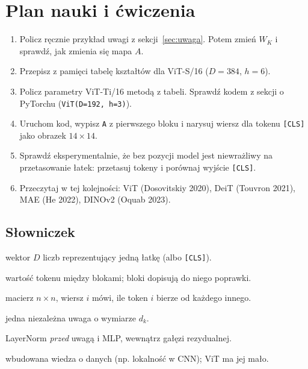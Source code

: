\documentclass[11pt,a4paper]{article}
\begin{document}
\section{Plan nauki i ćwiczenia}
\begin{enumerate}[itemsep=3pt]
  \item Policz ręcznie przykład uwagi z sekcji~\ref{sec:uwaga}. Potem zmień $W_K$ i sprawdź, jak zmienia się mapa $A$.
  \item Przepisz z pamięci tabelę kształtów dla ViT-S/16 ($D=384$, $h=6$).
  \item Policz parametry ViT-Ti/16 metodą z tabeli. Sprawdź kodem z sekcji o PyTorchu (\texttt{ViT(D=192, h=3)}).
  \item Uruchom kod, wypisz \texttt{A} z pierwszego bloku i narysuj wiersz dla tokenu \texttt{[CLS]} jako obrazek $14\times14$.
  \item Sprawdź eksperymentalnie, że bez pozycji model jest niewrażliwy na przetasowanie łatek: przetasuj tokeny i porównaj wyjście \texttt{[CLS]}.
  \item Przeczytaj w tej kolejności: ViT (Dosovitskiy 2020), DeiT (Touvron 2021), MAE (He 2022), DINOv2 (Oquab 2023).
\end{enumerate}

\subsection*{Słowniczek}
\begin{description}[itemsep=1pt,font=\normalfont\bfseries]
  \item[token] wektor $D$ liczb reprezentujący jedną łatkę (albo \texttt{[CLS]}).
  \item[strumień rezydualny] wartość tokenu między blokami; bloki dopisują do niego poprawki.
  \item[mapa uwagi $A$] macierz $n\times n$, wiersz $i$ mówi, ile token $i$ bierze od każdego innego.
  \item[głowa] jedna niezależna uwaga o wymiarze $d_k$.
  \item[pre-norm] LayerNorm \emph{przed} uwagą i MLP, wewnątrz gałęzi rezydualnej.
  \item[indukcyjne założenie] wbudowana wiedza o danych (np. lokalność w CNN); ViT ma jej mało.
\end{description}
\end{document}
